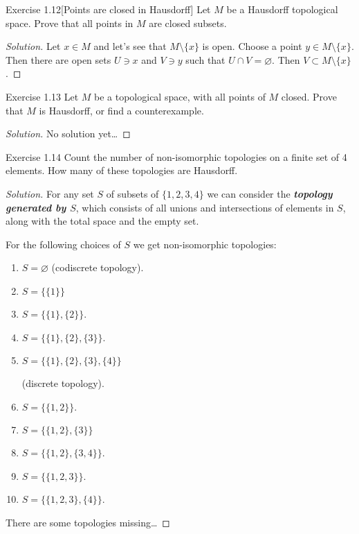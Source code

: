\begin{thing4}{Exercise 1.12}[Points are closed in Hausdorff]\label{exer:1.12}\leavevmode
Let $M$ be a Hausdorff topological space. Prove that all points in $M$ are closed subsets.
\end{thing4}

\begin{proof}[Solution]\leavevmode
Let $x \in M$ and let's see that $M\setminus \{x\}$ is open. Choose a point $y \in M\setminus \{ x\}$. Then there are open sets $U \ni x$ and $V \ni y$ such that $ U \cap V= \varnothing$. Then $V \subset M\setminus \{ x\}$.
\end{proof}

\begin{thing4}{Exercise 1.13}\leavevmode
	Let $M$ be a topological space, with all points of $M$ closed. Prove that $M$ is Hausdorff, or find a counterexample.
\end{thing4}

\begin{proof}[Solution]\leavevmode
No solution yet…
\end{proof}

\begin{thing4}{Exercise 1.14}\leavevmode
	Count the number of non-isomorphic topologies on a finite set of 4 elements. How many of these topologies are Hausdorff.
\end{thing4}

\begin{proof}[Solution]\leavevmode
For any set $S$ of subsets of $\{1,2,3,4\}$ we can consider the \textit{\textbf{topology generated by $S$}}, which consists of all unions and intersections of elements in $S$, along with the total space and the empty set.

For the following choices of $S$ we get non-isomorphic topologies:
\begin{multicols}{2}
\begin{enumerate}
\item  $S=\varnothing$ (codiscrete topology).
\item $S=\Big\{\{1\}\Big\}$
\item $S=\Big\{\{1\},\{2\}\Big\}$.
\item $S=\Big\{\{1\},\{2\},\{3\}\Big\}$.
\item $S=\Big\{\{1\},\{2\},\{3\},\{4\}\Big\}$

	(discrete topology).
\columnbreak\item $S=\Big\{\{1,2\}\Big\}$.
\item $S=\Big\{\{1,2\},\{3\}\Big\}$
\item $S=\Big\{\{1,2\},\{3,4\}\Big\}$.
\item $S=\Big\{\{1,2,3\}\Big\}$.
\item $S=\Big\{\{1,2,3\},\{4\}\Big\}$.
\end{enumerate}
\end{multicols}
{\color{2}There are some topologies missing…}
\end{proof}

